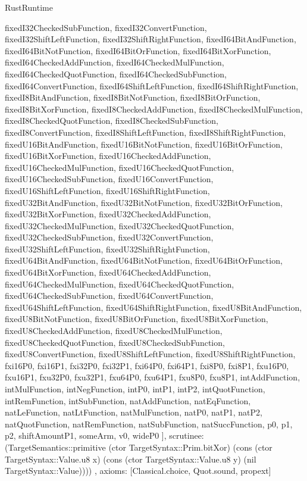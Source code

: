 \begin{lexlean}{RustRuntime}
\begin{semanticmodule}
{{      fixedI32CheckedSubFunction,
      fixedI32ConvertFunction,
      fixedI32ShiftLeftFunction,
      fixedI32ShiftRightFunction,
      fixedI64BitAndFunction,
      fixedI64BitNotFunction,
      fixedI64BitOrFunction,
      fixedI64BitXorFunction,
      fixedI64CheckedAddFunction,
      fixedI64CheckedMulFunction,
      fixedI64CheckedQuotFunction,
      fixedI64CheckedSubFunction,
      fixedI64ConvertFunction,
      fixedI64ShiftLeftFunction,
      fixedI64ShiftRightFunction,
      fixedI8BitAndFunction,
      fixedI8BitNotFunction,
      fixedI8BitOrFunction,
      fixedI8BitXorFunction,
      fixedI8CheckedAddFunction,
      fixedI8CheckedMulFunction,
      fixedI8CheckedQuotFunction,
      fixedI8CheckedSubFunction,
      fixedI8ConvertFunction,
      fixedI8ShiftLeftFunction,
      fixedI8ShiftRightFunction,
      fixedU16BitAndFunction,
      fixedU16BitNotFunction,
      fixedU16BitOrFunction,
      fixedU16BitXorFunction,
      fixedU16CheckedAddFunction,
      fixedU16CheckedMulFunction,
      fixedU16CheckedQuotFunction,
      fixedU16CheckedSubFunction,
      fixedU16ConvertFunction,
      fixedU16ShiftLeftFunction,
      fixedU16ShiftRightFunction,
      fixedU32BitAndFunction,
      fixedU32BitNotFunction,
      fixedU32BitOrFunction,
      fixedU32BitXorFunction,
      fixedU32CheckedAddFunction,
      fixedU32CheckedMulFunction,
      fixedU32CheckedQuotFunction,
      fixedU32CheckedSubFunction,
      fixedU32ConvertFunction,
      fixedU32ShiftLeftFunction,
      fixedU32ShiftRightFunction,
      fixedU64BitAndFunction,
      fixedU64BitNotFunction,
      fixedU64BitOrFunction,
      fixedU64BitXorFunction,
      fixedU64CheckedAddFunction,
      fixedU64CheckedMulFunction,
      fixedU64CheckedQuotFunction,
      fixedU64CheckedSubFunction,
      fixedU64ConvertFunction,
      fixedU64ShiftLeftFunction,
      fixedU64ShiftRightFunction,
      fixedU8BitAndFunction,
      fixedU8BitNotFunction,
      fixedU8BitOrFunction,
      fixedU8BitXorFunction,
      fixedU8CheckedAddFunction,
      fixedU8CheckedMulFunction,
      fixedU8CheckedQuotFunction,
      fixedU8CheckedSubFunction,
      fixedU8ConvertFunction,
      fixedU8ShiftLeftFunction,
      fixedU8ShiftRightFunction,
      fxi16P0,
      fxi16P1,
      fxi32P0,
      fxi32P1,
      fxi64P0,
      fxi64P1,
      fxi8P0,
      fxi8P1,
      fxu16P0,
      fxu16P1,
      fxu32P0,
      fxu32P1,
      fxu64P0,
      fxu64P1,
      fxu8P0,
      fxu8P1,
      intAddFunction,
      intMulFunction,
      intNegFunction,
      intP0,
      intP1,
      intP2,
      intQuotFunction,
      intRemFunction,
      intSubFunction,
      natAddFunction,
      natEqFunction,
      natLeFunction,
      natLtFunction,
      natMulFunction,
      natP0,
      natP1,
      natP2,
      natQuotFunction,
      natRemFunction,
      natSubFunction,
      natSuccFunction,
      p0,
      p1,
      p2,
      shiftAmountP1,
      someArm,
      v0,
      wideP0
    ],
    scrutinee: (TargetSemantics::primitive (ctor TargetSyntax::Prim.bitXor) (cons (ctor TargetSyntax::Value.u8 x) (cons (ctor TargetSyntax::Value.u8 y) (nil TargetSyntax::Value))))
  },
  axioms: [Classical.choice, Quot.sound, propext]
}


\end{semanticmodule}
\end{lexlean}
